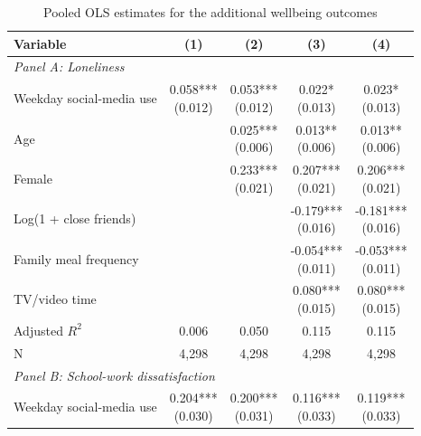 \begin{table}[!htbp]
\centering
\caption{Pooled OLS estimates for the additional wellbeing outcomes}
\label{tab:pooled_ols_other_outcomes}
\scriptsize
\setlength{\tabcolsep}{4pt}
\renewcommand{\arraystretch}{0.88}
\begin{tabular}{lcccc}
\hline
Variable & (1) & (2) & (3) & (4) \\
\hline
\multicolumn{5}{l}{\textit{Panel A: Loneliness}} \\
\hline
Weekday social-media use & \shortstack[c]{0.058*** \\[-0.35ex] (0.012)} & \shortstack[c]{0.053*** \\[-0.35ex] (0.012)} & \shortstack[c]{0.022* \\[-0.35ex] (0.013)} & \shortstack[c]{0.023* \\[-0.35ex] (0.013)}
\\
Age &  & \shortstack[c]{0.025*** \\[-0.35ex] (0.006)} & \shortstack[c]{0.013** \\[-0.35ex] (0.006)} & \shortstack[c]{0.013** \\[-0.35ex] (0.006)}
\\
Female &  & \shortstack[c]{0.233*** \\[-0.35ex] (0.021)} & \shortstack[c]{0.207*** \\[-0.35ex] (0.021)} & \shortstack[c]{0.206*** \\[-0.35ex] (0.021)}
\\
Log(1 + close friends) &  &  & \shortstack[c]{-0.179*** \\[-0.35ex] (0.016)} & \shortstack[c]{-0.181*** \\[-0.35ex] (0.016)}
\\
Family meal frequency &  &  & \shortstack[c]{-0.054*** \\[-0.35ex] (0.011)} & \shortstack[c]{-0.053*** \\[-0.35ex] (0.011)}
\\
TV/video time &  &  & \shortstack[c]{0.080*** \\[-0.35ex] (0.015)} & \shortstack[c]{0.080*** \\[-0.35ex] (0.015)}
\\
\hline
Adjusted $R^2$ & 0.006 & 0.050 & 0.115 & 0.115
\\
N & 4,298 & 4,298 & 4,298 & 4,298
\\
\hline
\multicolumn{5}{l}{\textit{Panel B: School-work dissatisfaction}} \\
\hline
Weekday social-media use & \shortstack[c]{0.204*** \\[-0.35ex] (0.030)} & \shortstack[c]{0.200*** \\[-0.35ex] (0.031)} & \shortstack[c]{0.116*** \\[-0.35ex] (0.033)} & \shortstack[c]{0.119*** \\[-0.35ex] (0.033)}

\end{tabular}
\end{table}
